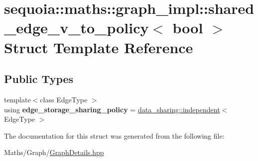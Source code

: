 \hypertarget{structsequoia_1_1maths_1_1graph__impl_1_1shared__edge__v__to__policy}{}\section{sequoia\+::maths\+::graph\+\_\+impl\+::shared\+\_\+edge\+\_\+v\+\_\+to\+\_\+policy$<$ bool $>$ Struct Template Reference}
\label{structsequoia_1_1maths_1_1graph__impl_1_1shared__edge__v__to__policy}
\subsection*{Public Types}
\begin{DoxyCompactItemize}
\item 
\mbox{\label{structsequoia_1_1maths_1_1graph__impl_1_1shared__edge__v__to__policy_ade3233e43db905db1346af3d5f5a86bf}} 
{\footnotesize template$<$class Edge\+Type $>$ }\\using {\bfseries edge\+\_\+storage\+\_\+sharing\+\_\+policy} = \mbox{\hyperlink{structsequoia_1_1data__sharing_1_1independent}{data\+\_\+sharing\+::independent}}$<$ Edge\+Type $>$
\end{DoxyCompactItemize}


The documentation for this struct was generated from the following file\+:\begin{DoxyCompactItemize}
\item 
Maths/\+Graph/\mbox{\hyperlink{_graph_details_8hpp}{Graph\+Details.\+hpp}}\end{DoxyCompactItemize}
